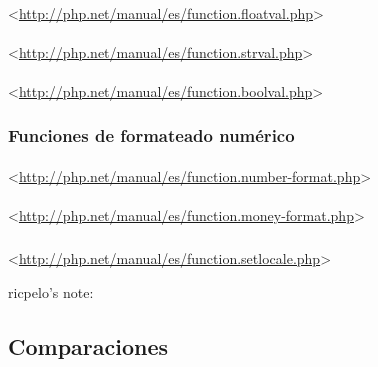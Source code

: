 \documentclass[a4paper,11pt,spanish]{sphinxmanual}
\begin{document}
\paragraph{}
\label{\detokenize{php:floatval}}
\textless{}\url{http://php.net/manual/es/function.floatval.php}\textgreater{}


\paragraph{}
\label{\detokenize{php:strval}}
\textless{}\url{http://php.net/manual/es/function.strval.php}\textgreater{}


\paragraph{}
\label{\detokenize{php:boolval}}
\textless{}\url{http://php.net/manual/es/function.boolval.php}\textgreater{}


\subsubsection{Funciones de formateado numérico}
\label{\detokenize{php:funciones-de-formateado-numerico}}

\paragraph{}
\label{\detokenize{php:number-format}}
\textless{}\url{http://php.net/manual/es/function.number-format.php}\textgreater{}


\paragraph{}
\label{\detokenize{php:money-format}}
\textless{}\url{http://php.net/manual/es/function.money-format.php}\textgreater{}


\subparagraph{}
\label{\detokenize{php:setlocale}}
\textless{}\url{http://php.net/manual/es/function.setlocale.php}\textgreater{}

ricpelo's note:


\subsection{Comparaciones}
\label{\detokenize{php:comparaciones}}
\end{document}
